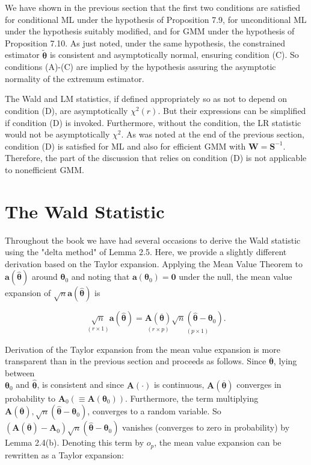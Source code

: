 \documentclass[10pt]{article}
\begin{document}
We have shown in the previous section that the first two conditions are satisfied for conditional ML under the hypothesis of Proposition 7.9, for unconditional ML under the hypothesis suitably modified, and for GMM under the hypothesis of Proposition 7.10. As just noted, under the same hypothesis, the constrained estimator $\tilde{\boldsymbol{\theta}}$ is consistent and asymptotically normal, ensuring condition (C). So conditions (A)-(C) are implied by the hypothesis assuring the asymptotic normality of the extremum estimator.

The Wald and LM statistics, if defined appropriately so as not to depend on condition (D), are asymptotically $\chi^{2}(r)$. But their expressions can be simplified if condition (D) is invoked. Furthermore, without the condition, the LR statistic would not be asymptotically $\chi^{2}$. As was noted at the end of the previous section, condition (D) is satisfied for ML and also for efficient GMM with $\mathbf{W}=\mathbf{S}^{-1}$. Therefore, the part of the discussion that relies on condition (D) is not applicable to nonefficient GMM.

\section*{The Wald Statistic}
Throughout the book we have had several occasions to derive the Wald statistic using the "delta method" of Lemma 2.5. Here, we provide a slightly different derivation based on the Taylor expansion. Applying the Mean Value Theorem to $\mathbf{a}(\hat{\boldsymbol{\theta}})$ around $\boldsymbol{\theta}_{0}$ and noting that $\mathbf{a}\left(\boldsymbol{\theta}_{0}\right)=\mathbf{0}$ under the null, the mean value expansion of $\sqrt{n} \mathbf{a}(\hat{\boldsymbol{\theta}})$ is


\begin{equation*}
\underset{(r \times 1)}{\sqrt{n}} \mathbf{a}(\hat{\boldsymbol{\theta}})=\underset{(r \times p)}{\mathbf{A}(\overline{\boldsymbol{\theta}})} \underset{(p \times 1)}{\sqrt{n}\left(\hat{\boldsymbol{\theta}}-\boldsymbol{\theta}_{0}\right)} . \tag{7.4.6}
\end{equation*}


Derivation of the Taylor expansion from the mean value expansion is more transparent than in the previous section and proceeds as follows. Since $\overline{\boldsymbol{\theta}}$, lying between\\
$\boldsymbol{\theta}_{0}$ and $\hat{\boldsymbol{\theta}}$, is consistent and since $\mathbf{A}(\cdot)$ is continuous, $\mathbf{A}(\overline{\boldsymbol{\theta}})$ converges in probability to $\mathbf{A}_{0}\left(\equiv \mathbf{A}\left(\boldsymbol{\theta}_{0}\right)\right)$. Furthermore, the term multiplying $\mathbf{A}(\overline{\boldsymbol{\theta}}), \sqrt{n}\left(\hat{\boldsymbol{\theta}}-\boldsymbol{\theta}_{0}\right)$, converges to a random variable. So $\left(\mathbf{A}(\overline{\boldsymbol{\theta}})-\mathbf{A}_{0}\right) \sqrt{n}\left(\hat{\boldsymbol{\theta}}-\boldsymbol{\theta}_{0}\right)$ vanishes (converges to zero in probability) by Lemma 2.4(b). Denoting this term by $o_{p}$, the mean value expansion can be rewritten as a Taylor expansion:
\end{document}
